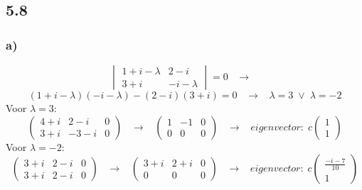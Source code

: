 \documentclass[11pt]{article}
\begin{document}
\subsection*{5.8}
\subsubsection*{a)}
\[
\begin{vmatrix}
1+i-\lambda & 2-i \\
3+i & -i-\lambda
\end{vmatrix}
=0
\;\;\;\longrightarrow\;\;\;
\]
\[
(1+i-\lambda)(-i-\lambda)-(2-i)(3+i)=0
\;\;\;\longrightarrow\;\;\;
\lambda = 3 \;\vee\; \lambda = -2
\]
Voor $\lambda = 3$: 
\[
\left(
\begin{array}{cc|c}
4+i & 2-i & 0 \\
3+i & -3-i & 0
\end{array}
\right)
\;\;\;\longrightarrow\;\;\;
\left(
\begin{array}{cc|c}
1 & -1 & 0 \\
0 & 0 & 0
\end{array}
\right)
\;\;\;\longrightarrow\;\;\;
eigenvector:\;
c
\begin{pmatrix}
1\\1
\end{pmatrix}
\]
Voor $\lambda = -2$: 
\[
\left(
\begin{array}{cc|c}
3+i & 2-i & 0 \\
3+i & 2-i & 0
\end{array}
\right)
\;\;\;\longrightarrow\;\;\;
\left(
\begin{array}{cc|c}
3+i & 2+i & 0 \\
0 & 0 & 0
\end{array}
\right)
\;\;\;\longrightarrow\;\;\;
eigenvector:\;
c
\begin{pmatrix}
\frac{-i-7}{10}\\1
\end{pmatrix}
\]
\end{document}
